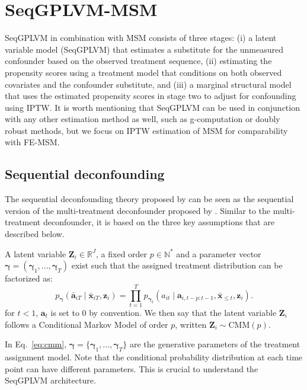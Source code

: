 \section{SeqGPLVM-MSM}
\label{sec:seqgplvm}

SeqGPLVM in combination with MSM consists of three
stages: (i) a latent variable model (SeqGPLVM) that estimates a substitute for the
unmeasured confounder based on the observed treatment sequence, (ii) estimating
the propensity scores using a treatment model that conditions on both observed
covariates and the confounder substitute, and (iii) a marginal
structural model that uses the estimated propensity scores in stage two to adjust
for confounding using IPTW. It is worth mentioning that SeqGPLVM can be used
in conjunction with any other estimation method as well, such as g-computation or doubly
robust methods, but we focus on IPTW estimation of MSM for comparability with
FE-MSM.


\subsection{Sequential deconfounding}

The sequential deconfounding theory proposed by 
 can be seen as the sequential version of 
the multi-treatment deconfounder proposed by . Similar 
to the multi-treatment deconfounder, it is based on the three key assumptions that are 
described below. 

\begin{idassumpSG}\label{ass:SG-Marcovianity}
    A latent variable $\mathbf{Z}_i \in \mathbb{R}^J $, a fixed order $p \in \mathbb{N}^*$
    and a parameter vector $\boldsymbol{\gamma} = (\boldsymbol{\gamma}_1, \ldots, \boldsymbol{\gamma}_T)$ exist such that the assigned treatment distribution can be 
    factorized as: 
    \begin{equation}
    p_{\boldsymbol{\gamma}}(\bar{\mathbf{a}}_{iT} \mid \bar{\mathbf{x}}_{iT}, \mathbf{z}_i) 
    = \prod_{t=1}^T p_{\boldsymbol{\gamma}_t}(a_{it} \mid \mathbf{a}_{i,t-p:t-1}, \bar{\mathbf{x}}_{\leq t}, \mathbf{z}_i). 
    \label{eq:cmm}
    \end{equation}
    for $t<1$, $\mathbf{a}_t$ is set to $0$ by convention. We then say that the 
    latent variable $\mathbf{Z}_i$ follows a Conditional Markov Model of order $p$, 
    written $\mathbf{Z}_i \sim \text{CMM} (p)$.
\end{idassumpSG}
In Eq.~\eqref{eq:cmm},
\(\boldsymbol{\gamma} = \{\boldsymbol{\gamma}_1, \ldots, \boldsymbol{\gamma}_T\}\) are the generative 
parameters of the treatment assignment model. Note that the conditional 
probability 
distribution at
each time point can have different parameters. 
This is crucial to understand the SeqGPLVM architecture. 

